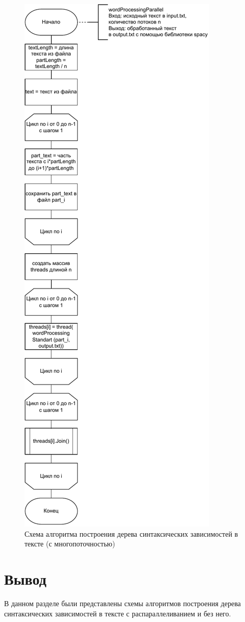 \begin{figure}[h!]
\centering
\includegraphics[width=0.5\linewidth]{img/paral}
\caption{Схема алгоритма построения дерева синтаксических зависимостей в тексте (с многопоточностью)}
\label{fig:paral}
\end{figure}

\clearpage

\section{Вывод}

В данном разделе были представлены схемы алгоритмов построения дерева синтаксических зависимостей в тексте с распараллеливанием и без него.